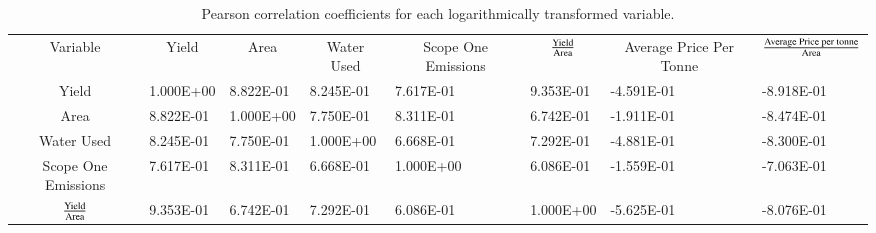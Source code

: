 \documentclass[review,12pt,authoryear]{elsarticle}
\begin{document}
\begin{linenumbers}
  \begin{table}[]
    \caption{Pearson correlation coefficients for each logarithmically transformed variable.}
    \label{tab:tab3}
    \begin{tabular}{clllllll}
    Variable                                           & \multicolumn{1}{c}{Yield} & \multicolumn{1}{c}{Area} & \multicolumn{1}{c}{Water Used} & \multicolumn{1}{c}{Scope One Emissions} & \multicolumn{1}{c}{$\textrm{Yield}\over\textrm{Area}$} & \multicolumn{1}{c}{Average Price Per Tonne} & \multicolumn{1}{c}{${\textrm{Average Price per tonne}\over\textrm{Area}}$} \\
    Yield                                              & 1.000E+00                 & 8.822E-01                & 8.245E-01                      & 7.617E-01                               & 9.353E-01                                          & -4.591E-01                                  & -8.918E-01                                                             \\
    Area                                               & 8.822E-01                 & 1.000E+00                & 7.750E-01                      & 8.311E-01                               & 6.742E-01                                          & -1.911E-01                                  & -8.474E-01                                                             \\
    Water Used                                         & 8.245E-01                 & 7.750E-01                & 1.000E+00                      & 6.668E-01                               & 7.292E-01                                          & -4.881E-01                                  & -8.300E-01                                                             \\
    Scope One Emissions                                & 7.617E-01                 & 8.311E-01                & 6.668E-01                      & 1.000E+00                               & 6.086E-01                                          & -1.559E-01                                  & -7.063E-01                                                             \\
    $\textrm{Yield}\over\textrm{Area}$                     & 9.353E-01                 & 6.742E-01                & 7.292E-01                      & 6.086E-01                               & 1.000E+00                                          & -5.625E-01                                  & -8.076E-01                                                             \\

\end{tabular}
\end{table}
\end{linenumbers}
\end{document}
